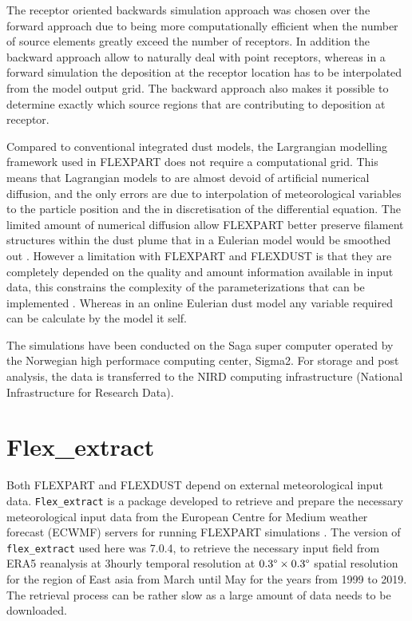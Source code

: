 The receptor oriented backwards simulation approach was chosen over the forward approach due to being more computationally efficient when the number of source elements greatly exceed the number of receptors. In addition the backward approach allow to naturally deal with point receptors, whereas in a forward simulation the deposition at the receptor location has to be interpolated from the model output grid. The backward approach also makes it possible to determine exactly which source regions that are contributing to deposition at receptor.     

Compared to conventional integrated dust models, the Largrangian modelling framework used in FLEXPART does not require a computational grid. This means that Lagrangian models to are almost devoid of artificial numerical diffusion, and the only errors are due to interpolation of meteorological variables to the particle position and the in discretisation of the differential equation. The limited amount of numerical diffusion allow FLEXPART better preserve filament structures within the dust plume that in a Eulerian model would be smoothed out \parencite{cassiani_offline_2016}. However a limitation with FLEXPART and FLEXDUST is that they are completely depended on the quality and amount information available in input data, this constrains the complexity of the parameterizations that can be implemented \parencite{flexpart_wetdep}. Whereas in an online Eulerian dust model any variable required can be calculate by the model it self.       

The simulations have been conducted on the Saga super computer operated by the Norwegian high performace 
computing center, Sigma2. For storage and post analysis, the data is transferred to the 
NIRD computing infrastructure (National Infrastructure for Research Data). 


\section{Flex\_extract}
Both FLEXPART and FLEXDUST depend on external meteorological input data. \verb|Flex_extract| is a package developed to retrieve and prepare the necessary meteorological input data from the European Centre for Medium weather forecast (ECWMF) servers for running FLEXPART simulations \parencite{tipka_flex_extract_2020}. 
The version of \verb|flex_extract| used here was 7.0.4, to retrieve the necessary input field from ERA5 reanalysis at 3hourly temporal resolution at $0.3\degree \times 0.3\degree$ spatial resolution for the region of East asia from March until May for the years from 1999 to 2019. The retrieval process can be rather slow as a large amount of data needs to be downloaded.     

